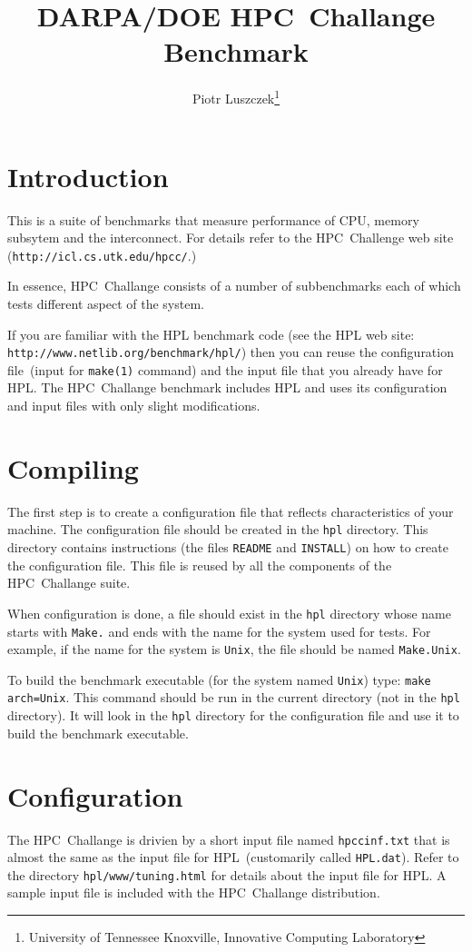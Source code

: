 \documentclass[twocolumn]{article}
\begin{document}
\title{DARPA/DOE HPC~Challange Benchmark} \author{Piotr
Luszczek\footnote{University of Tennessee Knoxville, Innovative
Computing Laboratory}} \maketitle

\section{Introduction}
This is a suite of benchmarks that measure performance of CPU, memory
subsytem and the interconnect. For details refer to the
HPC~Challenge web site (\texttt{http://icl.cs.utk.edu/hpcc/}.)

In essence, HPC~Challange consists of a number of subbenchmarks each
of which tests different aspect of the system.

If you are familiar with the HPL benchmark code (see the HPL web site:
\texttt{http://www.netlib.org/benchmark/hpl/}) then you can reuse the
configuration file~(input for \texttt{make(1)} command) and the input
file that you already have for HPL. The HPC~Challange benchmark
includes HPL and uses its configuration and input files with only
slight modifications.

\section{Compiling}
The first step is to create a configuration file that reflects
characteristics of your machine. The configuration file should be
created in the \texttt{hpl} directory. This directory contains
instructions (the files \texttt{README} and \texttt{INSTALL}) on how
to create the configuration file. This file is reused by all the
components of the HPC~Challange suite.

When configuration is done, a file should exist in the \texttt{hpl}
directory whose name starts with \texttt{Make.} and ends with the name
for the system used for tests. For example, if the name for the system
is \texttt{Unix}, the file should be named \texttt{Make.Unix}.

To build the benchmark executable (for the system named \texttt{Unix})
type: \texttt{make arch=Unix}.  This command should be run in the
current directory (not in the \texttt{hpl} directory). It will look in
the \texttt{hpl} directory for the configuration file and use it to
build the benchmark executable.

\section{Configuration}
The HPC~Challange is drivien by a short input file named
\texttt{hpccinf.txt} that is almost the same as the input file for
HPL~(customarily called \texttt{HPL.dat}). Refer to the directory
\texttt{hpl/www/tuning.html} for details about the input file for
HPL. A sample input file is included with the HPC~Challange
distribution.
\end{document}
